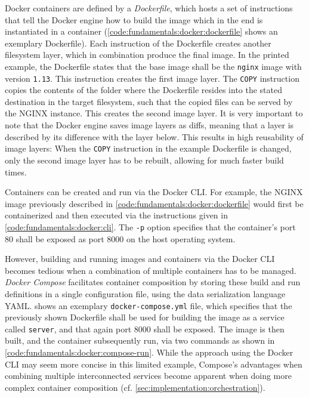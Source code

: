 Docker containers are defined by a \emph{Dockerfile}, which hosts a set of instructions that tell the Docker engine how to build the image which in the end is instantiated in a container (\cref{code:fundamentals:docker:dockerfile} shows an exemplary Dockerfile).
Each instruction of the Dockerfile creates another filesystem layer, which in combination produce the final image.
In the printed example, the Dockerfile states that the base image shall be the \texttt{nginx} image with version \texttt{1.13}.
This instruction creates the first image layer.
The \texttt{COPY} instruction copies the contents of the folder where the Dockerfile resides into the stated destination in the target filesystem, such that the copied files can be served by the NGINX instance.
This creates the second image layer.
It is very important to note that the Docker engine saves image layers as diffs, meaning that a layer is described by its  difference with the layer below.
This results in high reusability of image layers: When the \texttt{COPY} instruction in the example Dockerfile is changed, only the second image layer has to be rebuilt, allowing for much faster build times.



Containers can be created and run via the Docker \ac{CLI}.
For example, the NGINX image previously described in \cref{code:fundamentals:docker:dockerfile} would first be containerized and then executed via the instructions given in \cref{code:fundamentals:docker:cli}.
The \texttt{-p} option specifies that the container's port 80 shall be exposed as port 8000 on the host operating system.



However, building and running images and containers via the Docker \ac{CLI} becomes tedious when a combination of multiple containers has to be managed.
\emph{Docker Compose} facilitates container composition by storing these build and run definitions in a single configuration file, using the data serialization language \ac{YAML}.
 shows an exemplary \texttt{docker-compose.yml} file, which specifies that  the previously shown Dockerfile shall be used for building the image as a service called \texttt{server}, and that again port 8000 shall be exposed.
The image is then built, and the container subsequently run, via two commands as shown in \cref{code:fundamentals:docker:compose-run}.
While the approach using the Docker CLI may seem more concise in this limited example, Compose's advantages when combining multiple interconnected services become apparent when doing more complex container composition (cf. \cref{sec:implementation:orchestration}).

